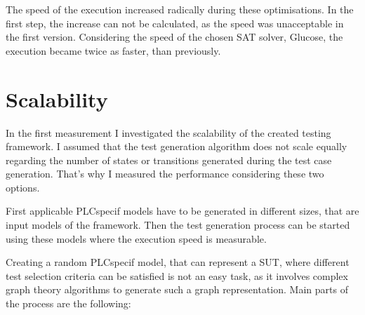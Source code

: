 The speed of the execution increased radically during these optimisations. In the first step, the increase can not be calculated, as the speed was unacceptable in the first version. Considering the speed of the chosen SAT solver, Glucose, the execution became twice as faster, than previously.


\section{Scalability}
\label{sec:scalability}

In the first measurement I investigated the scalability of the created testing framework. I assumed that the test generation algorithm does not scale equally regarding the number of states or transitions generated during the test case generation. That's why I measured the performance considering these two options.

First applicable PLCspecif models have to be generated in different sizes, that are input models of the framework. Then the test generation process can be started using these models where the execution speed is measurable.

Creating a random PLCspecif model, that can represent a SUT, where different test selection criteria can be satisfied is not an easy task, as it involves complex graph theory algorithms to generate such a graph representation. Main parts of the process are the following:

